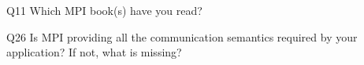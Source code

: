 \begin{description}%
\item{Q11} Which MPI book(s) have you read?%
\item{Q26} Is MPI providing all the communication semantics required by your application? If not, what is missing?%
\end{description}%
